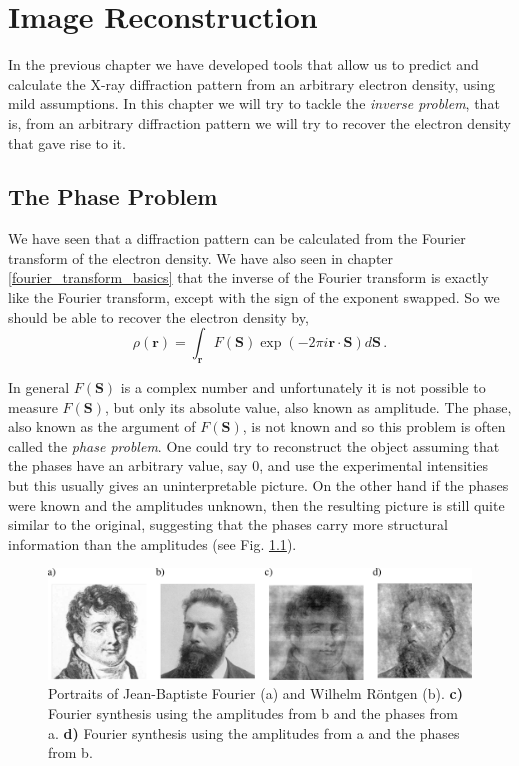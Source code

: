 \chapter{Image Reconstruction}\label{Image Reconstruction}\noindent

In the previous chapter we have developed tools that allow us to predict
and calculate the X-ray diffraction pattern from an arbitrary electron density,
using mild assumptions. In this chapter we will try to tackle the {\em inverse
  problem}, that is, from an arbitrary diffraction pattern we will try to
recover the electron density that gave rise to it.
\section{The Phase Problem}

We have seen that a diffraction pattern can be calculated from the Fourier
transform of the electron density. We have also seen in chapter
\ref{fourier_transform_basics} that the inverse of the Fourier transform is
exactly like the Fourier transform, except with the sign of the exponent
swapped. So we should be able to recover the electron density by,
\begin{equation}
\rho(\mathbf r) = \int_{\mathbf r} F(\mathbf S) \exp\left(-2
    \pi i \mathbf r \cdot \mathbf S \right) d\mathbf S\, .
\end{equation}

In general $F(\mathbf S)$ is a complex number and unfortunately it is not
possible to measure $F(\mathbf S)$, but only its absolute value, also known as
amplitude. The phase, also known as the argument of $F(\mathbf S)$, is not known and so
this problem is often called the {\em phase problem}. One could try to reconstruct the
object assuming that the phases have an arbitrary value, say 0, and use the
experimental intensities but this usually gives an uninterpretable picture. On
the other hand if the phases were known and the amplitudes unknown, then the
resulting picture is still quite similar to the original, suggesting that the
phases carry more structural information than the amplitudes (see Fig. \ref{Fig:PhaseSwapping}).
\begin{figure}[h]
  \centering
  \includegraphics[width=1 \columnwidth]{PhaseSwapping.png}
  \caption{Portraits of Jean-Baptiste Fourier (a) and Wilhelm R\"{o}ntgen (b).
    {\bf c)} Fourier synthesis using the amplitudes from b and the phases from
    a. {\bf d)}
    Fourier synthesis using the amplitudes from a and the phases from b.}
  \label{Fig:PhaseSwapping}
\end{figure}

